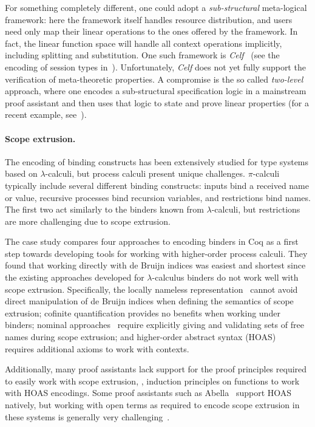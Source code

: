 \documentclass[runningheads]{llncs}
\begin{document}
For something completely different, one could adopt a \emph{sub-structural} meta-logical framework: here the framework itself handles resource distribution, and users need only map their linear operations to the ones offered by the framework.
In fact, the linear function space will handle all context operations implicitly, including splitting and substitution.
One such framework is \emph{Celf}~\cite{Schack-Nielsen:IJCAR08} (see the encoding of session types in~\cite{Bock2016}).
Unfortunately, \emph{Celf} does not yet fully support the verification of meta-theoretic properties.
A compromise is the so called \emph{two-level} approach, where one encodes a sub-structural specification logic in a mainstream proof assistant and then uses that logic to state and prove linear properties (for a recent example, see~\cite{Felty:MSCS21}).

\paragraph{Scope extrusion.}
The encoding of binding constructs has been extensively studied for type systems based on $\lambda$-calculi, but process calculi present unique challenges.
$\pi$-calculi typically include several different binding constructs: inputs bind a received name or value, recursive processes bind recursion variables, and restrictions bind names.
The first two act similarly to the binders known from $\lambda$-calculi, but restrictions are more challenging due to scope extrusion.

The case study \cite{AmbalLS21} compares four approaches to encoding binders in Coq as a first step towards developing tools for working with higher-order process calculi.
They found that working directly with de Bruijn indices was easiest and shortest since the existing approaches developed for $\lambda$-calculus binders do not work well with scope extrusion.
Specifically, the locally nameless representation~\cite{Chargueraud2012} cannot avoid direct manipulation of de Bruijn indices when defining the semantics of scope extrusion; cofinite quantification provides no benefits when working under binders; nominal approaches~\cite{Pitts2003} require explicitly giving and validating sets of free names during scope extrusion; and higher-order abstract syntax (HOAS)~\cite{Pfenning1988} requires additional axioms to work with contexts.

Additionally, many proof assistants lack support for the proof principles required to easily work with scope extrusion, \ie, induction principles on functions to work with HOAS encodings.
Some proof assistants such as Abella~\cite{Baelde2014} support HOAS natively, but working with open terms as required to encode scope extrusion in these systems is generally very challenging~\cite{Momigliano2012}.
\end{document}
